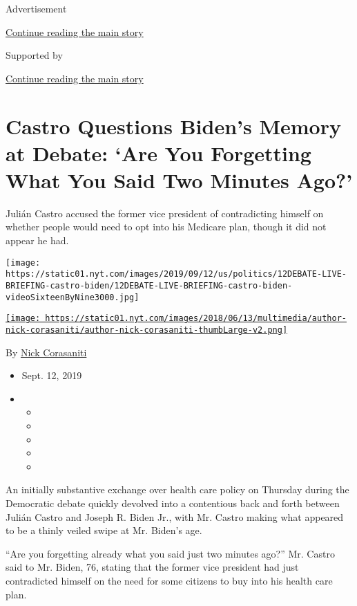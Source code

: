 Advertisement

\protect\hyperlink{after-top}{Continue reading the main story}

Supported by

\protect\hyperlink{after-sponsor}{Continue reading the main story}

\hypertarget{castro-questions-bidens-memory-at-debate-are-you-forgetting-what-you-said-two-minutes-ago}{%
\section{Castro Questions Biden's Memory at Debate: `Are You Forgetting
What You Said Two Minutes
Ago?'}\label{castro-questions-bidens-memory-at-debate-are-you-forgetting-what-you-said-two-minutes-ago}}

Julián Castro accused the former vice president of contradicting himself
on whether people would need to opt into his Medicare plan, though it
did not appear he had.

\texttt{[image: https://static01.nyt.com/images/2019/09/12/us/politics/12DEBATE-LIVE-BRIEFING-castro-biden/12DEBATE-LIVE-BRIEFING-castro-biden-videoSixteenByNine3000.jpg]}

\href{https://www.nytimes.com/by/nick-corasaniti}{\texttt{[image: https://static01.nyt.com/images/2018/06/13/multimedia/author-nick-corasaniti/author-nick-corasaniti-thumbLarge-v2.png]}}

By \href{https://www.nytimes.com/by/nick-corasaniti}{Nick Corasaniti}

\begin{itemize}
\item
  Sept. 12, 2019
\item
  \begin{itemize}
  \item
  \item
  \item
  \item
  \item
  \end{itemize}
\end{itemize}

An initially substantive exchange over health care policy on Thursday
during the Democratic debate quickly devolved into a contentious back
and forth between Julián Castro and Joseph R. Biden Jr., with Mr. Castro
making what appeared to be a thinly veiled swipe at Mr. Biden's age.

``Are you forgetting already what you said just two minutes ago?'' Mr.
Castro said to Mr. Biden, 76, stating that the former vice president had
just contradicted himself on the need for some citizens to buy into his
health care plan.

